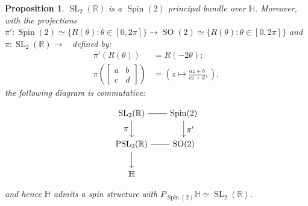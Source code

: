 \documentclass[12pt]{amsart}
\newtheorem{proposition}{Proposition}%
\theoremstyle{definition}
\def\RR{{\mathbb R}}
\def\HH{{\mathbb{H}}}
\DeclareMathOperator{\psl}{PSL_2(\mathbb{R})}
\newcommand{\slinear}{\operatorname{SL}}
\newcommand{\so}{\operatorname{SO}}
\newcommand{\spin}{\operatorname{Spin}}
\begin{document}
\begin{proposition}\label{spinStructureForH}
$\slinear_2(\RR)$ is a $\spin(2)$ principal bundle over $\HH$. Moreover, with the projections $\pi': \spin(2)\simeq \{R(\theta):\theta\in [0,2\pi] \} \longrightarrow \so(2)\simeq \{R(\theta):\theta\in [0,2\pi] \}$ and $\pi: \slinear_2(\RR) \longrightarrow \psl$ defined by:
\begin{align*}
\pi'(R(\theta))
&= R(-2\theta);\\
\pi\left(
\begin{bmatrix}
a & b\\
c & d
\end{bmatrix}
\right)
&=
\left(
z \mapsto \frac{az+b}{cz + d},
\right),
\end{align*}
the following diagram is commutative:
\begin{equation}\label{spinStructureHDiagram}
\begin{tikzpicture}[baseline=(current  bounding  box.center)]
  \matrix (m) [matrix of math nodes,row sep=2em,column sep=2em,minimum width=2em]
  {
      \slinear_2(\RR)& \spin(2) \\
      \psl & \so(2) \\
	    \HH & {} \\  
  };
  \path
    (m-1-1) edge node [ above] {} (m-1-2)
    (m-2-1)	edge node [below] {} (m-2-2);
    
    
  \path[->] 
  	(m-1-1) edge node [left]{$\pi$} (m-2-1)
  	(m-1-2)	edge node [right] {$\pi'$} (m-2-2)
  	(m-2-1) edge node [left] {} (m-3-1);
\end{tikzpicture}
\end{equation}
and hence $\HH$ admits a spin structure with $P_{\spin(2)}\HH \simeq \slinear_2(\RR)$.
\end{proposition}
\end{document}
